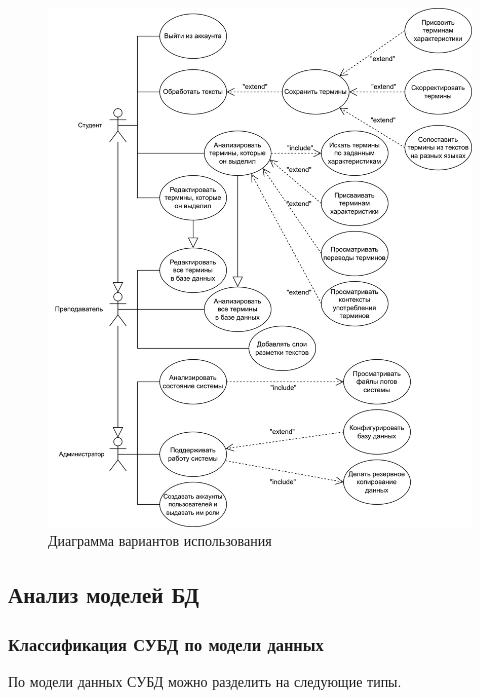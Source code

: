 \begin{figure}[h]
	\centering
	\includegraphics[width=\textwidth ]{img/Use-case/Use-case.drawio.png}
	\caption{Диаграмма вариантов использования}
	\label{fig:use-case}
\end{figure} 

\clearpage



\subsection{Анализ моделей БД}

\subsubsection{Классификация СУБД по модели данных}

По модели данных СУБД можно разделить на следующие типы.

